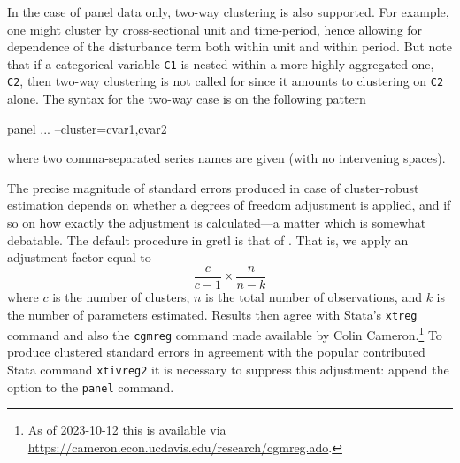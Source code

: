 In the case of panel data only, two-way clustering is also supported.
For example, one might cluster by cross-sectional unit and
time-period, hence allowing for dependence of the disturbance term
both within unit and within period. But note that if a categorical
variable \texttt{C1} is nested within a more highly aggregated one,
\texttt{C2}, then two-way clustering is not called for since it
amounts to clustering on \texttt{C2} alone. The syntax for the two-way
case is on the following pattern
\begin{code}
panel ... --cluster=cvar1,cvar2
\end{code}
where two comma-separated series names are given (with no intervening
spaces).

The precise magnitude of standard errors produced in case of
cluster-robust estimation depends on whether a degrees of freedom
adjustment is applied, and if so on how exactly the adjustment is
calculated---a matter which is somewhat debatable. The default
procedure in gretl is that of \cite{CGM2011}. That is, we apply an
adjustment factor equal to
\[
  \frac{c}{c-1} \times \frac{n}{n-k}
\]
where $c$ is the number of clusters, $n$ is the total number of
observations, and $k$ is the number of parameters estimated. Results
then agree with \textsf{Stata}'s \texttt{xtreg} command and also the
\texttt{cgmreg} command made available by Colin Cameron.\footnote{As
  of 2023-10-12 this is available via
  \url{https://cameron.econ.ucdavis.edu/research/cgmreg.ado}.}  To
produce clustered standard errors in agreement with the popular
contributed \textsf{Stata} command \texttt{xtivreg2} it is necessary
to suppress this adjustment: append the  option to
the \texttt{panel} command.


